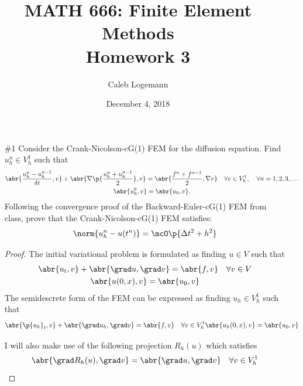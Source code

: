 \documentclass[11pt, titlepage]{article}
\author{Caleb Logemann}
\title{MATH 666: Finite Element Methods \\ Homework 3}
\date{December 4, 2018}
\begin{document}
\maketitle

%
\begin{enumerate}
  \item[\#1]
    Consider the Crank-Nicolson-cG(1) FEM for the diffusion equation.
    Find $u^n_h \in V^1_h$ such that
    \begin{gather*}
      \abr{\frac{u^n_h - u^{n-1}_h}{\delta t}, v} +
      \abr{\nabla \p{\frac{u^n_h + u^{n-1}_h}{2}}, v} = 
      \abr{\frac{f^n + f^{n-1}}{2}, \nabla v}
      \quad \forall v \in V^1_h, \quad \forall n = 1, 2, 3, \ldots \\
      \abr{u^0_h, v} = \abr{u_0, v}.
    \end{gather*}
    Following the convergence proof of the Backward-Euler-cG(1) FEM from class,
    prove that the Crank-Nicolson-cG(1) FEM satisfies:
    \[
      \norm{u^n_h - u(t^n)} = \mcO\p{\Delta t^2 + h^2}
    \]

    \begin{proof}
      The initial variational problem is formulated as finding $u \in V$ such that
      \begin{gather*}
        \abr{u_t, v} + \abr{\grad u, \grad v} = \abr{f, v} \quad \forall v \in V \\
        \abr{u(0, x), v} = \abr{u_0, v}
      \end{gather*}
      The semidescrete form of the FEM can be expressed as finding $u_h \in V^1_h$
      such that
      \[
        \abr{\p{u_h}_t, v} + \abr{\grad u_h, \grad v} = \abr{f, v} \quad \forall v \in V^1_h
        \abr{u_h(0, x), v} = \abr{u_0, v}
      \]

      I will also make use of the following projection $R_h(u)$ which satisfies
      \[
        \abr{\grad R_h(u), \grad v} = \abr{\grad u, \grad v} \quad \forall v \in V^1_h
      \]


\end{proof}
\end{enumerate}
\end{document}
